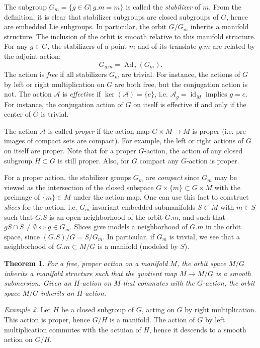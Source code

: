 \documentclass{article}
\newtheorem{theorem}{Theorem}[section]
\theoremstyle{remark}
\newtheorem{example}[theorem]{Example}
\newcommand\A{\mathcal{A}}
\newcommand{\on}{\operatorname}
\newcommand{\Ad}{ \on{Ad} }
\renewcommand{\ker}{ \on{ker}} \newcommand{\im}{ \on{im}}
\begin{document}
The subgroup $G_m=\{g\in G|\,g.m=m\}$ is 
called the {\em stabilizer} of $m$. From the definition, it is clear that stabilizer subgroups are closed 
subgroups of $G$, hence are embedded Lie subgroups. In particular, the orbit $G/G_m$ inherits a manifold 
structure. The inclusion of the orbit is smooth relative to this manifold structure.  
For any $g\in G$, the stabilizers of a point $m$ and of its translate $g.m$ are 
related by the adjoint action: 
%
$$ G_{g.m}=\Ad_g(G_m).$$
%
The action is {\em free} if all stabilizers $G_m$ 
are trivial. For instance, the actions of $G$ by left or right multiplication on $G$ are both 
free, but the conjugation action is not. The action $\A$ is  {\em effective} if $\ker(\A)=\{e\}$, i.e. 
$\A_g=\on{id}_M$ implies $g=e$. For instance, the conjugation action of $G$ on itself is 
effective if and only if the center of $G$ is trivial. 

The action $\A$ is called {\em proper} if the action map $G\times M\to M$ is proper (i.e. pre-images of 
compact sets are compact). For example, the left or right actions of $G$ on itself are proper.
Note that for a proper $G$-action, the action of any closed subgroup $H\subset G$ is still proper.  
Also, for $G$ compact any $G$-action is proper. 

For a proper action, the stabilizer groups $G_m$ are \emph{compact} since $G_m$ may be viewed as the 
intersection of the closed subspace $G\times\{m\}\subset G\times M$ with the 
preimage of $\{m\}\in M$ under the action map. One can use this fact to construct \emph{slices} 
for the action, i.e. $G_m$-invariant embedded submanifolds $S\subset M$ with $m\in S$ such that 
$G.S$ is an open neighborhood of the orbit $G.m$, and such that $gS\cap S\not=\emptyset
\Leftrightarrow g\in G_m$. Slices give models a neighborhood of $G.m$ 
in the orbit space, since $(G.S)/G=S/G_m$. In particular, if $G_m$ is trivial, we see that 
a neighborhood of $G.m\subset M/G$ is a manifold (modeled by $S$).
% 
\begin{theorem}
For a free, proper action on a manifold $M$, the orbit space $M/G$ inherits a manifold structure 
such that the quotient map $M\to M/G$ is a smooth submersion. Given an $H$-action on $M$ that commutes 
 with the $G$-action, the orbit space $M/G$ inherits an $H$-action.  
\end{theorem}

\begin{example}
Let $H$ be a closed subgroup of $G$, acting on $G$ by right multiplication. This action is proper, hence
$G/H$ is a manifold. The action of $G$ by left multiplication commutes with the actuion of $H$, hence it 
descends to a smooth action on $G/H$.  
\end{example}
\end{document}
